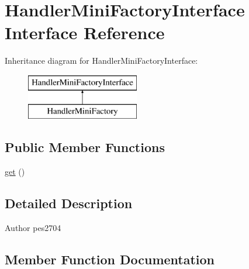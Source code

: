 \hypertarget{interface_pes_1_1_database_1_1_handler_1_1_mini_1_1_handler_mini_factory_interface}{}\section{Handler\+Mini\+Factory\+Interface Interface Reference}
\label{interface_pes_1_1_database_1_1_handler_1_1_mini_1_1_handler_mini_factory_interface}
Inheritance diagram for Handler\+Mini\+Factory\+Interface\+:\begin{figure}[H]
\begin{center}
\leavevmode
\includegraphics[height=2.000000cm]{interface_pes_1_1_database_1_1_handler_1_1_mini_1_1_handler_mini_factory_interface}
\end{center}
\end{figure}
\subsection*{Public Member Functions}
\begin{DoxyCompactItemize}
\item 
\mbox{\hyperlink{interface_pes_1_1_database_1_1_handler_1_1_mini_1_1_handler_mini_factory_interface_ac33ee765f5ad9f134540bac393721cfe}{get}} ()
\end{DoxyCompactItemize}


\subsection{Detailed Description}
\begin{DoxyAuthor}{Author}
pes2704 
\end{DoxyAuthor}


\subsection{Member Function Documentation}
\mbox{\label{interface_pes_1_1_database_1_1_handler_1_1_mini_1_1_handler_mini_factory_interface_ac33ee765f5ad9f134540bac393721cfe}} 
